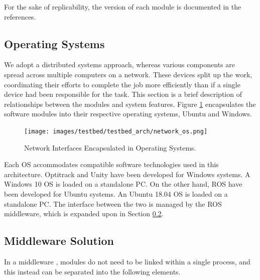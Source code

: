For the sake of replicability, the version of each module is documented in the references.


\subsection{Operating Systems}

We adopt a distributed systems approach, whereas various components are spread across multiple computers on a network. These devices split up the work, coordinating their efforts to complete the job more efficiently than if a single device had been responsible for the task. This section is a brief description of relationships between the modules and system features. Figure \ref{fig:OS_diagram} encapsulates the software modules into their respective operating systems, Ubuntu and Windows. 


\begin{figure}[!h]
  \raggedright
  \texttt{[image: images/testbed/testbed\_arch/network\_os.png]}
  \caption{Network Interfaces Encapsulated in Operating Systems. }
  \label{fig:OS_diagram}
\end{figure}

Each OS accommodates compatible software technologies used in this architecture. Optitrack and Unity have been developed for Windows systems. A Windows 10 OS is loaded on a standalone PC. On the other hand, ROS have been developed for Ubuntu systems. An Ubuntu 18.04 OS is loaded on a standalone PC. The interface between the two is managed by the ROS middleware, which is expanded upon in Section \ref{section:middleware}. 

\pagebreak


\subsection{Middleware Solution}\label{section:middleware}

In a middleware \cite{ros_docs}, modules do not need to be linked within a single process, and this instead can be separated into the following elements.

